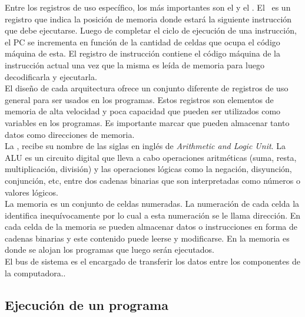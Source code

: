 Entre los registros de uso específico, los más importantes son el \textbf{\PC} y el \textbf{\IR}. El \PC\ es un registro que indica la posición de memoria donde estará la siguiente instrucción que debe ejecutarse. Luego de completar el ciclo de ejecución de una instrucción, el PC se incrementa en función de la cantidad de celdas que ocupa el código máquina de esta. El registro de instrucción contiene el código máquina de la instrucción actual una vez que la misma es leída de memoria para luego decodificarla y ejecutarla.\\

El diseño de cada arquitectura ofrece un conjunto diferente de registros de uso general para ser usados en los programas. Estos registros son elementos de memoria de alta velocidad y poca capacidad que pueden ser utilizados como variables en los programas. Es importante marcar que pueden almacenar tanto datos como direcciones de memoria.\\

La \ALU, recibe su nombre de las siglas en inglés de \textit{Arithmetic and Logic Unit}. La ALU es un circuito digital que lleva a cabo operaciones aritméticas (suma, resta, multiplicación, división) y las operaciones lógicas como la negación, disyunción, conjunción, etc, entre dos cadenas binarias que son interpretadas como números o valores lógicos.\\

La memoria es un conjunto de celdas numeradas. La numeración de cada celda la identifica inequívocamente por lo cual a esta numeración se le llama dirección. En cada celda de la memoria se pueden almacenar datos o instrucciones en forma de cadenas binarias y este contenido puede leerse y modificarse. En la memoria es donde se alojan los programas que luego serán ejecutados.\\

El bus de sistema es el encargado de transferir los datos entre los componentes de la computadora..

\subsection{Ejecución de un programa}

